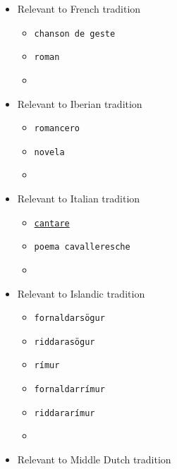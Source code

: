 \begin{itemize}
    \begin{multicols}{2}
        \begin{itemize}
            \item Relevant to French tradition
                \begin{itemize}
                    \item \texttt{chanson de geste}
                    \item \texttt{roman}
                    \item {}
                \end{itemize}
            \item Relevant to Iberian tradition
            \begin{itemize}
                \item \texttt{romancero}
                \item \texttt{novela}
                \item {}
            \end{itemize}
            \item Relevant to Italian tradition
            \begin{itemize}
                \item \href{https://www.oxfordbibliographies.com/display/document/obo-9780195396584/obo-9780195396584-0199.xml}{\texttt{cantare}}
                \item \texttt{poema cavalleresche}
                \item {}
            \end{itemize}
            \item Relevant to Islandic tradition
                \begin{itemize}
                    \item \texttt{fornaldarsögur}
                    \item \texttt{riddarasögur}
                    \item \texttt{rímur}
                    \item \texttt{fornaldarrímur}
                    \item \texttt{riddararímur}
                    \item {}
                \end{itemize}
            \item Relevant to Middle Dutch tradition
                \begin{itemize}

\end{itemize}
\end{itemize}
\end{multicols}
\end{itemize}
